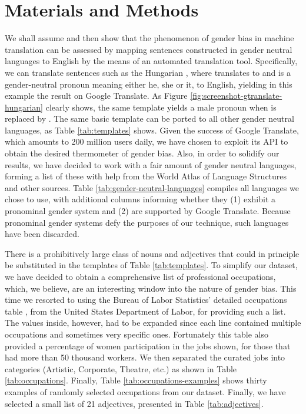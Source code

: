 \documentclass[fleqn,10pt]{article}
\begin{document}
\section{Materials and Methods}

We shall assume and then show that the phenomenon of gender bias in machine translation can be assessed by mapping sentences constructed in gender neutral languages to English by the means of an automated translation tool. Specifically, we can translate sentences such as the Hungarian , where  translates to  and  is a gender-neutral pronoun meaning either he, she or it, to English, yielding in this example the result  on Google Translate. As Figure \ref{fig:screenshot-gtranslate-hungarian} clearly shows, the same template yields a male pronoun when  is replaced by . The same basic template can be ported to all other gender neutral languages, as Table \ref{tab:templates} shows. Given the success of Google Translate, which amounts to 200 million users daily, we have chosen to exploit its API to obtain the desired thermometer of gender bias. Also, in order to solidify our results, we have decided to work 
 with a fair amount of gender neutral languages, forming a list of these with help from the World Atlas of Language Structures \cite{wals} and other sources. Table \ref{tab:gender-neutral-languages} compiles all languages we chose to use, with additional columns informing whether they
(1) exhibit a pronominal gender system and (2) are supported by Google Translate. Because pronominal gender systems defy the purposes of our technique, such languages have been discarded.

There is a prohibitively large class of nouns and adjectives that could in principle be substituted in the templates of Table \ref{tab:templates}. To simplify our dataset, we have decided to obtain a comprehensive list of professional occupations, which, we believe, are an interesting window into the nature of gender bias. This time we resorted to using the Bureau of Labor Statistics' detailed occupations table \cite{BLS2017}, from the United States Department of Labor, for providing such a list. The values inside, however, had to be expanded since each line contained multiple occupations and sometimes very specific ones. Fortunately this table also provided a percentage of women participation in the jobs shown, for those that had more than 50 thousand workers. We then separated the curated jobs into categories (Artistic, Corporate, Theatre, etc.) as shown in Table \ref{tab:occupations}. Finally, Table \ref{tab:occupations-examples} shows thirty examples of randomly selected occupations from our dataset. Finally, we have selected a small list of 21 adjectives, presented in Table \ref{tab:adjectives}.
\end{document}
